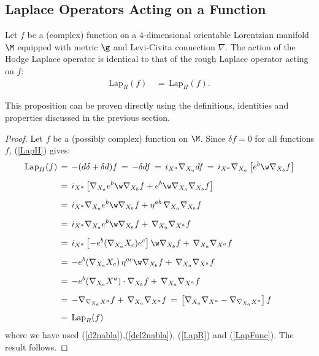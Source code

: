 \documentclass[sections]{tjwNOTES}
\newcommand{\LapH}{\text{Lap}_{H}}
\newcommand{\LapR}{\text{Lap}_{R}}
\begin{document}
\subsection{Laplace Operators Acting on a Function}

\begin{prop*}{}
	Let $f$ be a (complex) function on a $4$-dimensional orientable Lorentzian manifold $\M$ equipped with metric $\g$ and Levi-Civita connection $\nabla$. The action of the Hodge Laplace operator is identical to that of the rough Laplace operator acting on $f$:
	\begin{align}\label{LapFunc}
		\LapR(f) &\,=\, \LapH(f). 
	\end{align}
\end{prop*}

This proposition can be proven directly using the definitions, identities and properties discussed in the previous section.\\

\begin{proof}
	Let $f$ be a (possibly complex) function on $\M$. Since $\delta f=0$ for all functions $f$, (\ref{LapH}) gives:
	\begin{align*}
		\LapH(f) &\,=\, -(d\delta + \delta d)f \,=\, -\delta df \,=\, i_{X^{a}}\nabla_{X_{a}}df \,=\, i_{X^{a}}\nabla_{X_{a}}\left[e^{b}\w \nabla_{X_{b}}f\right] \\[0.2cm]
		&\,=\, i_{X^{a}}\left[\nabla_{X_{a}}e^{b}\w \nabla_{X_{b}}f + e^{b}\w \nabla_{X_{a}}\nabla_{X_{b}}f\right] \\[0.2cm]
		&\,=\, i_{X^{a}}\nabla_{X_{a}}e^{b}\w \nabla_{X_{b}}f + \eta^{ab}\,\nabla_{X_{a}}\nabla_{X_{b}}f \\[0.2cm]
		&\,=\, i_{X^{a}}\nabla_{X_{a}}e^{b}\w \nabla_{X_{b}}f + \,\nabla_{X_{a}}\nabla_{X^{a}}f \\[0.2cm] 
		&\,=\, i_{X^{a}}\left[-e^{b}(\nabla_{X_{a}}X_{c})e^{c}\right]\w \nabla_{X_{b}}f + \,\nabla_{X_{a}}\nabla_{X^{a}}f \\[0.2cm]
		&\,=\, -e^{b}(\nabla_{X_{a}}X_{c})\,\eta^{ac}\w \nabla_{X_{b}}f + \,\nabla_{X_{a}}\nabla_{X^{a}}f \\[0.2cm]
		&\,=\, -e^{b}(\nabla_{X_{a}}X^{a})\cdot\nabla_{X_{b}}f + \,\nabla_{X_{a}}\nabla_{X^{a}}f \\[0.2cm]
		&\,=\, -\nabla_{\nabla_{X_{a}}X^{a}}f + \,\nabla_{X_{a}}\nabla_{X^{a}}f\,=\, \left[ \nabla_{X_{a}}\nabla_{X^{a}} - \nabla_{\nabla_{X_{a}}X^{a}}\right]f \\[0.2cm]
		&\,=\, \LapR(f)
	\end{align*}
	where we have used (\ref{d2nabla}),(\ref{del2nabla}), (\ref{LapR}) and (\ref{LapFunc}). The result follows.
\end{proof}
\end{document}

